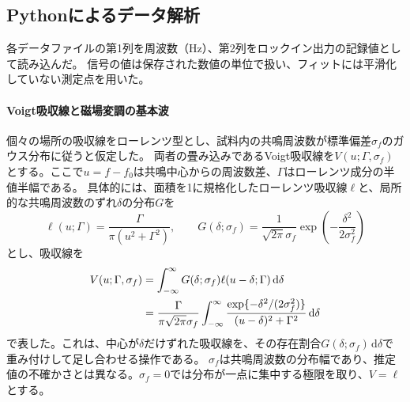 \documentclass[dvipdfmx,a4paper,11pt]{jsarticle}
\begin{document}
\subsection{Pythonによるデータ解析}
\label{sec:data-analysis}
各データファイルの第1列を周波数（Hz）、第2列をロックイン出力の記録値として読み込んだ。
信号の値は保存された数値の単位で扱い、フィットには平滑化していない測定点を用いた。

\paragraph{Voigt吸収線と磁場変調の基本波}
個々の場所の吸収線をローレンツ型とし、試料内の共鳴周波数が標準偏差$\sigma_f$のガウス分布に従うと仮定した。
両者の畳み込みであるVoigt吸収線を$V(u;\Gamma,\sigma_f)$とする。ここで$u=f-f_0$は共鳴中心からの周波数差、$\Gamma$はローレンツ成分の半値半幅である。
具体的には、面積を1に規格化したローレンツ吸収線$\ell$と、局所的な共鳴周波数のずれ$\delta$の分布$G$を
\begin{equation}
 \ell(u;\Gamma)=\frac{\Gamma}{\pi(u^2+\Gamma^2)},\qquad
 G(\delta;\sigma_f)=\frac{1}{\sqrt{2\pi}\sigma_f}
 \exp\!\left(-\frac{\delta^2}{2\sigma_f^2}\right)
\end{equation}
とし、吸収線を
\begin{align}
 V(u;\Gamma,\sigma_f)
 &=\int_{-\infty}^{\infty}G(\delta;\sigma_f)\ell(u-\delta;\Gamma)\,\mathrm{d}\delta\notag\\
 &=\frac{\Gamma}{\pi\sqrt{2\pi}\sigma_f}
 \int_{-\infty}^{\infty}
 \frac{\exp\{-\delta^2/(2\sigma_f^2)\}}{(u-\delta)^2+\Gamma^2}\,\mathrm{d}\delta
 \label{eq:voigt-convolution}
\end{align}
で表した。これは、中心が$\delta$だけずれた吸収線を、その存在割合$G(\delta;\sigma_f)\,\mathrm{d}\delta$で重み付けして足し合わせる操作である。
$\sigma_f$は共鳴周波数の分布幅であり、推定値の不確かさとは異なる。$\sigma_f=0$では分布が一点に集中する極限を取り、$V=\ell$とする。
\end{document}

